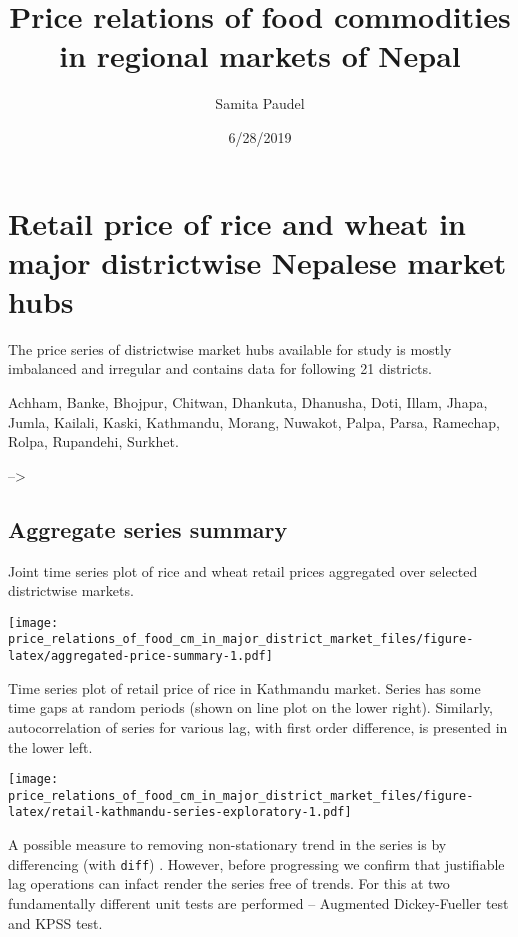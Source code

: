 \documentclass[
  12pt,
]{article}
\title{Price relations of food commodities in regional markets of Nepal}
\author{Samita Paudel}
\date{6/28/2019}
\begin{document}
\maketitle

\hypertarget{retail-price-of-rice-and-wheat-in-major-districtwise-nepalese-market-hubs}{%
\section{Retail price of rice and wheat in major districtwise Nepalese market hubs}\label{retail-price-of-rice-and-wheat-in-major-districtwise-nepalese-market-hubs}}

The price series of districtwise market hubs available for study is mostly imbalanced and irregular and contains data for following 21 districts.

Achham, Banke, Bhojpur, Chitwan, Dhankuta, Dhanusha, Doti, Illam, Jhapa, Jumla, Kailali, Kaski, Kathmandu, Morang, Nuwakot, Palpa, Parsa, Ramechap, Rolpa, Rupandehi, Surkhet.

--\textgreater{}

\hypertarget{aggregate-series-summary}{%
\subsection{Aggregate series summary}\label{aggregate-series-summary}}

Joint time series plot of rice and wheat retail prices aggregated over selected districtwise markets.

\texttt{[image: price\_relations\_of\_food\_cm\_in\_major\_district\_market\_files/figure-latex/aggregated-price-summary-1.pdf]}

Time series plot of retail price of rice in Kathmandu market. Series has some time gaps at random periods (shown on line plot on the lower right). Similarly, autocorrelation of series for various lag, with first order difference, is presented in the lower left.

\texttt{[image: price\_relations\_of\_food\_cm\_in\_major\_district\_market\_files/figure-latex/retail-kathmandu-series-exploratory-1.pdf]}

A possible measure to removing non-stationary trend in the series is by differencing (with \texttt{diff}) . However, before progressing we confirm that justifiable lag operations can infact render the series free of trends. For this at two fundamentally different unit tests are performed -- Augmented Dickey-Fueller test and KPSS test.
\end{document}
